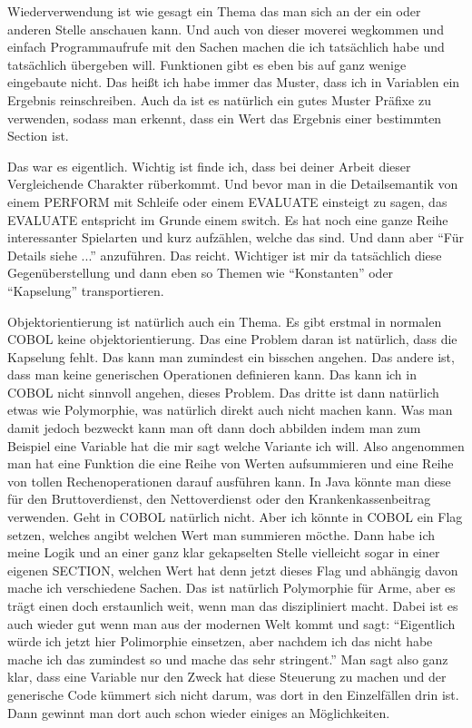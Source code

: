 {Wiederverwendung ist wie gesagt ein Thema das man sich an der ein oder anderen Stelle anschauen kann. Und auch von dieser moverei wegkommen und einfach Programmaufrufe mit den Sachen machen die ich tatsächlich habe und tatsächlich übergeben will. Funktionen gibt es eben bis auf ganz wenige eingebaute nicht. Das heißt ich habe immer das Muster, dass ich in Variablen ein Ergebnis reinschreiben. Auch da ist es natürlich ein gutes Muster Präfixe zu verwenden, sodass man erkennt, dass ein Wert das Ergebnis einer bestimmten Section ist.

Das war es eigentlich. Wichtig ist finde ich, dass bei deiner Arbeit dieser Vergleichende Charakter rüberkommt. Und bevor man in die Detailsemantik von einem PERFORM mit Schleife oder einem EVALUATE einsteigt zu sagen, das EVALUATE entspricht im Grunde einem switch. Es hat noch eine ganze Reihe interessanter Spielarten und kurz aufzählen, welche das sind. Und dann aber ``Für Details siehe ...'' anzuführen. Das reicht. Wichtiger ist mir da tatsächlich diese Gegenüberstellung und dann eben so Themen wie ``Konstanten'' oder ``Kapselung'' transportieren.

Objektorientierung ist natürlich auch ein Thema. Es gibt erstmal in normalen COBOL keine objektorientierung. Das eine Problem daran ist natürlich, dass die Kapselung fehlt. Das kann man zumindest ein bisschen angehen. Das andere ist, dass man keine generischen Operationen definieren kann. Das kann ich in COBOL nicht sinnvoll angehen, dieses Problem. Das dritte ist dann natürlich etwas wie Polymorphie, was natürlich direkt auch nicht machen kann. Was man damit jedoch bezweckt kann man oft dann doch abbilden indem man zum Beispiel eine Variable hat die mir sagt welche Variante ich will. Also angenommen man hat eine Funktion die eine Reihe von Werten aufsummieren und eine Reihe von tollen Rechenoperationen darauf ausführen kann. In Java könnte man diese für den Bruttoverdienst, den Nettoverdienst oder den Krankenkassenbeitrag verwenden. Geht in COBOL natürlich nicht. Aber ich könnte in COBOL ein Flag setzen, welches angibt welchen Wert man summieren möcthe. Dann habe ich meine Logik und an einer ganz klar gekapselten Stelle vielleicht sogar in einer eigenen SECTION, welchen Wert hat denn jetzt dieses Flag und abhängig davon mache ich verschiedene Sachen. Das ist natürlich Polymorphie für Arme, aber es trägt einen doch erstaunlich weit, wenn man das diszipliniert macht. Dabei ist es auch wieder gut wenn man aus der modernen Welt kommt und sagt: ``Eigentlich würde ich jetzt hier Polimorphie einsetzen, aber nachdem ich das nicht habe mache ich das zumindest so und mache das sehr stringent.'' Man sagt also ganz klar, dass eine Variable nur den Zweck hat diese Steuerung zu machen und der generische Code kümmert sich nicht darum, was dort in den Einzelfällen drin ist. Dann gewinnt man dort auch schon wieder einiges an Möglichkeiten.

}
